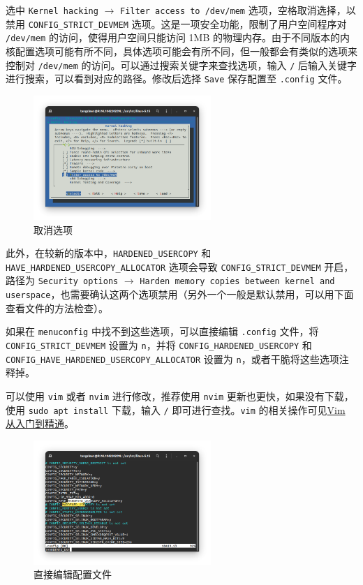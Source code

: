 选中 \texttt{Kernel hacking} $\to$ \texttt{Filter access to /dev/mem} 选项，空格取消选择，以禁用 \texttt{CONFIG\_STRICT\_DEVMEM} 选项。这是一项安全功能，限制了用户空间程序对 \texttt{/dev/mem} 的访问，使得用户空间只能访问 1MB 的物理内存。由于不同版本的内核配置选项可能有所不同，具体选项可能会有所不同，但一般都会有类似的选项来控制对 \texttt{/dev/mem} 的访问。可以通过搜索关键字来查找选项，输入 \texttt{/} 后输入关键字进行搜索，可以看到对应的路径。修改后选择 \texttt{Save} 保存配置至 \texttt{.config} 文件。
\begin{figure}[htbp]
    \centering
    \includegraphics[width=0.6\textwidth]{images/filter.png}
    \caption{取消选项}
\end{figure}

此外，在较新的版本中，\texttt{HARDENED\_USERCOPY} 和 \texttt{HAVE\_HARDENED\_USERCOPY\_ALLOCATOR} 选项会导致 \texttt{CONFIG\_STRICT\_DEVMEM} 开启，路径为 \texttt{Security options} $\to$ \texttt{Harden memory copies between kernel and userspace}，也需要确认这两个选项禁用（另外一个一般是默认禁用，可以用下面查看文件的方法检查）。

如果在 \texttt{menuconfig} 中找不到这些选项，可以直接编辑 \texttt{.config} 文件，将 \texttt{CONFIG\_STRICT\_DEVMEM} 设置为 \texttt{n}，并将 \texttt{CONFIG\_HARDENED\_USERCOPY} 和 \texttt{CONFIG\_HAVE\_HARDENED\_USERCOPY\_ALLOCATOR} 设置为 \texttt{n}，或者干脆将这些选项注释掉。

可以使用 \texttt{vim} 或者 \texttt{nvim} 进行修改，推荐使用 \texttt{nvim} 更新也更快，如果没有下载，使用 \texttt{sudo apt install} 下载，输入 \texttt{/} 即可进行查找。\texttt{vim} 的相关操作可见\href{https://github.com/wsdjeg/vim-galore-zh_cn}{Vim 从入门到精通}。
\begin{figure}[htbp]
    \centering
    \includegraphics[width=0.6\textwidth]{images/vim.png}
    \caption{直接编辑配置文件}
\end{figure}

